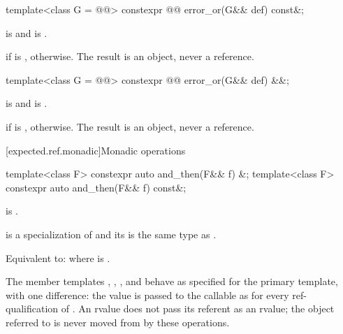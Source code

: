 %
\begin{itemdecl}
template<class G = @@>
constexpr @@ error_or(G&& def) const&;
\end{itemdecl}

\begin{itemdescr}
\pnum
\constraints
{} is  and  is .

\pnum
\returns
{} if  is ,  otherwise. The result is an object, never a reference.
\end{itemdescr}

%
\begin{itemdecl}
template<class G = @@> constexpr @@ error_or(G&& def) &&;
\end{itemdecl}

\begin{itemdescr}
\pnum
\constraints
{} is  and  is .

\pnum
\returns
{} if  is ,  otherwise. The result is an object, never a reference.
\end{itemdescr}

[expected.ref.monadic]{Monadic operations}

%
\begin{itemdecl}
template<class F> constexpr auto and_then(F&& f) &;
template<class F> constexpr auto and_then(F&& f) const&;
\end{itemdecl}

\begin{itemdescr}
\pnum
\constraints
{} is .

\pnum
\mandates
{} is a specialization of  and its  is the same type as .

\pnum
\effects
Equivalent to:  where  is .

\pnum
\remarks
The member templates , , , and  behave as specified for the primary template, with one difference: the value is passed to the callable as  for every ref-qualification of . An rvalue  does not pass its referent as an rvalue; the object referred to is never moved from by these operations.
\end{itemdescr}

